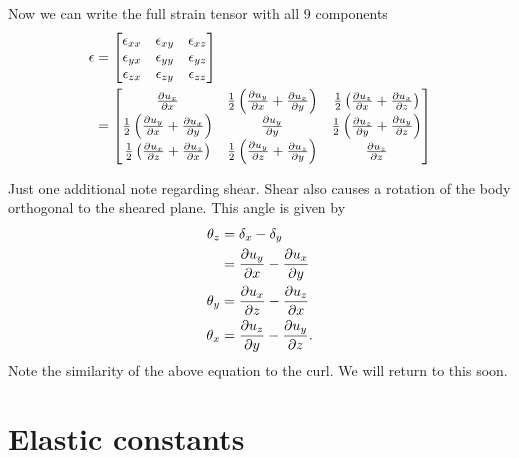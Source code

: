 Now we can write the full strain tensor with all 9 components
\begin{align*}
    \vb{\epsilon} & =
    \begin{bmatrix}
        \epsilon_{xx} & \epsilon_{xy} & \epsilon_{xz} \\
        \epsilon_{yx} & \epsilon_{yy} & \epsilon_{yz} \\
        \epsilon_{zx} & \epsilon_{zy} & \epsilon_{zz}
    \end{bmatrix} \\
    & =
    \begin{bmatrix}
        \pdv{u_x}{x} &
        \frac{1}{2}\left( \pdv{u_y}{x} + \pdv{u_x}{y} \right) &
        \frac{1}{2}\left( \pdv{u_z}{x} + \pdv{u_x}{z} \right) \\
        \frac{1}{2}\left( \pdv{u_y}{x} + \pdv{u_x}{y} \right) &
        \pdv{u_y}{y} &
        \frac{1}{2}\left( \pdv{u_z}{y} + \pdv{u_y}{z} \right) \\
        \frac{1}{2}\left( \pdv{u_x}{z} + \pdv{u_z}{x} \right) &
        \frac{1}{2}\left( \pdv{u_y}{z} + \pdv{u_z}{y} \right) &
        \pdv{u_z}{z}
    \end{bmatrix}
\end{align*}

Just one additional note regarding shear.  Shear also causes a rotation of the body orthogonal to the sheared plane.  This angle is given by
\begin{align}
    \theta_{z} & = \delta_x - \delta_y \\
    & = \pdv{u_y}{x} - \pdv{u_x}{y} \\
    \theta_{y} & = \pdv{u_x}{z} - \pdv{u_z}{x} \\
    \theta_{x} & = \pdv{u_z}{y} - \pdv{u_y}{z}.
\end{align}
Note the similarity of the above equation to the curl.  We will return to this soon. 


\section{Elastic constants}

